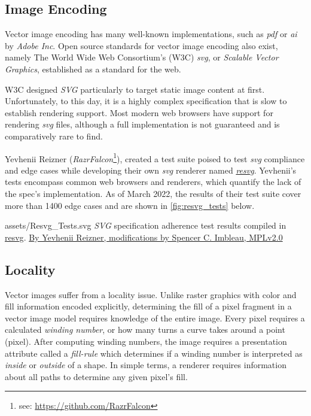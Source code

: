 \subsection{Image Encoding}\label{sec:image_encoding}
Vector image encoding has many well-known implementations, such as \textit{pdf} or \textit{ai} by \textit{Adobe Inc}. Open source standards for vector image encoding also exist, namely The World Wide Web Consortium's (W3C) \textit{svg}, or \textit{Scalable Vector Graphics}, established as a standard for the web.\medskip

W3C designed \textit{SVG} particularly to target static image content at first. Unfortunately, to this day, it is a highly complex specification that is slow to establish rendering support. Most modern web browsers have support for rendering \textit{svg} files, although a full implementation is not guaranteed and is comparatively rare to find.\medskip

Yevhenii Reizner (\textit{RazrFalcon}\footnote{see: \href{https://github.com/RazrFalcon}{https://github.com/RazrFalcon}}), created a test suite poised to test \textit{svg} compliance and edge cases while developing their own \textit{svg} renderer named \href{https://github.com/RazrFalcon/resvg}{\textit{resvg}}. Yevhenii's tests encompass common web browsers and renderers, which quantify the lack of the spec's implementation\cite{Resvg}. As of March 2022, the results of their test suite cover more than 1400 edge cases and are shown in \cref{fig:resvg_tests} below.\medskip

\widesvg
{assets/Resvg_Tests.svg}
{\label{fig:resvg_tests}\textit{SVG} specification adherence test results compiled in \href{https://github.com/RazrFalcon/resvg/tree/5e8c634457a70f9ac2656dc59e40da841a8fbe9b}{ resvg}.}
{\href{https://github.com/RazrFalcon/resvg/tree/5e8c634457a70f9ac2656dc59e40da841a8fbe9b\#svg-support}{By Yevhenii Reizner, modifications by Spencer C. Imbleau, MPLv2.0}}

\subsection{Locality}\label{sec:locality}
Vector images suffer from a locality issue. Unlike raster graphics with color and fill information encoded explicitly, determining the fill of a pixel fragment in a vector image model requires knowledge of the entire image. Every pixel requires a calculated \textit{winding number}, or how many turns a curve takes around a point (pixel). After computing winding numbers, the image requires a presentation attribute called a \textit{fill-rule} which determines if a winding number is interpreted as \emph{inside} or \emph{outside} of a shape. In simple terms, a renderer requires information about all paths to determine any given pixel's fill.

